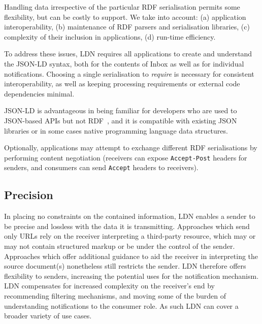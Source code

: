 \documentclass[a4paper]{llncs}
\begin{document}
\par Handling data irrespective of the particular RDF serialisation permits some flexibility, but can be costly to support. We take into account: (a) application interoperability, (b) maintenance of RDF parsers and serialisation libraries, (c) complexity of their inclusion in applications, (d) run-time efficiency.


\par

                                        To address these issues, LDN requires all applications to create and understand the JSON-LD syntax, both for the contents of Inbox as well as for individual notifications. Choosing a single serialisation to {\em require} is necessary for consistent interoperability, as well as keeping processing requirements or external code dependencies minimal.

                                        JSON-LD is advantageous in being familiar for developers who are \empty used to JSON-based APIs but not RDF~\cite{ref-20}, and it is compatible with existing JSON libraries or in some cases native programming language data structures.



\par Optionally, applications may attempt to exchange different RDF serialisations by performing content negotiation (receivers can expose {\tt Accept-Post} headers for senders, and consumers can send {\tt Accept} headers to receivers).




                                \subsection{Precision}
  \label{precision}



\par In placing no constraints on the contained information, LDN enables a sender to be precise and lossless with the data it is transmitting. Approaches which send only URLs rely on the receiver interpreting a third-party resource, which may or may not contain structured markup or be under the control of the sender. Approaches which offer additional guidance to aid the receiver in interpreting the source document(s) nonetheless still restricts the sender. LDN therefore offers flexibility to senders, increasing the potential uses for the notification mechanism. LDN compensates for increased complexity on the receiver’s end by recommending filtering mechanisms, and moving some of the burden of understanding notifications to the consumer role. As such LDN can cover a broader variety of use cases.
\end{document}
